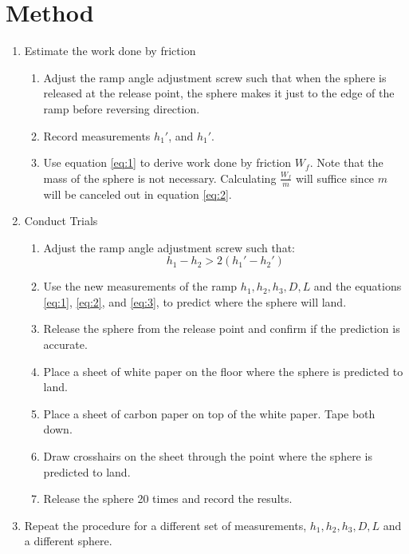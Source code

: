 \documentclass{article}
\begin{document}
\section{Method}
\begin{enumerate}

    \item Estimate the work done by friction 
        \begin{enumerate}
            \item Adjust the ramp angle adjustment screw such that when the sphere is released at the release point, the sphere makes it just to the edge of the ramp before reversing direction.
            \item Record measurements $h_{1}\ensuremath{'}$, and $h_{1}\ensuremath{'}$.
            \item Use equation \eqref{eq:1} to derive work done by friction $W_{f}$. Note that the mass of the sphere is not necessary. Calculating $\frac{W_{f}}{m}$ will suffice since $m$ will be canceled out in equation \eqref{eq:2}.
        \end{enumerate}

    \item Conduct Trials
        \begin{enumerate}
            \item Adjust the ramp angle adjustment screw such that: \\
                \begin{equation} h_{1} - h_{2} > 2(h_{1}\ensuremath{'} - h_{2}\ensuremath{'}) \end{equation}
            \item Use the new measurements of the ramp $h_{1}, h_{2}, h_{3}, D, L$ and the equations \eqref{eq:1}, \eqref{eq:2}, and \eqref{eq:3}, to predict where the sphere will land. 
            \item Release the sphere from the release point and confirm if the prediction is accurate.
            \item Place a sheet of white paper on the floor where the sphere is predicted to land.
            \item Place a sheet of carbon paper on top of the white paper. Tape both down.
            \item Draw crosshairs on the sheet through the point where the sphere is predicted to land.
            \item Release the sphere 20 times and record the results.

        \end{enumerate}

    \item Repeat the procedure for a different set of measurements, $h_{1}, h_{2}, h_{3}, D, L$ and a different sphere.
\end{enumerate}
 
\end{document}
